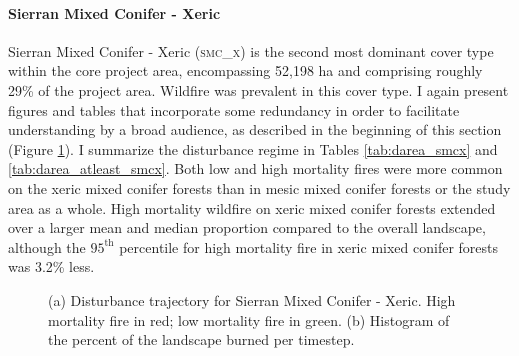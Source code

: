 \clearpage


\paragraph{Sierran Mixed Conifer - Xeric}
Sierran Mixed Conifer - Xeric (\textsc{smc\_x}) is the second most dominant cover type within the core project area, encompassing 52,198 ha and comprising roughly 29\% of the project area. Wildfire was prevalent in this cover type. I again present figures and tables that incorporate some redundancy in order to facilitate understanding by a broad audience, as described in the beginning of this section (Figure \ref{fig:darea_smcx}). I summarize the disturbance regime in Tables \ref{tab:darea_smcx} and \ref{tab:darea_atleast_smcx}. Both low and high mortality fires were more common on the xeric mixed conifer forests than in mesic mixed conifer forests or the study area as a whole. High mortality wildfire on xeric mixed conifer forests extended over a larger mean and median proportion compared to the overall landscape, although the $95^{\text{th}}$ percentile for high mortality fire in xeric mixed conifer forests was 3.2\% less.

\begin{figure}[!htbp]
  \centering
  \caption{\small (a) Disturbance trajectory for Sierran Mixed Conifer - Xeric. High mortality fire in red; low mortality fire in green. (b) Histogram of the percent of the landscape burned per timestep.} 
  \label{fig:darea_smcx}
\end{figure}

